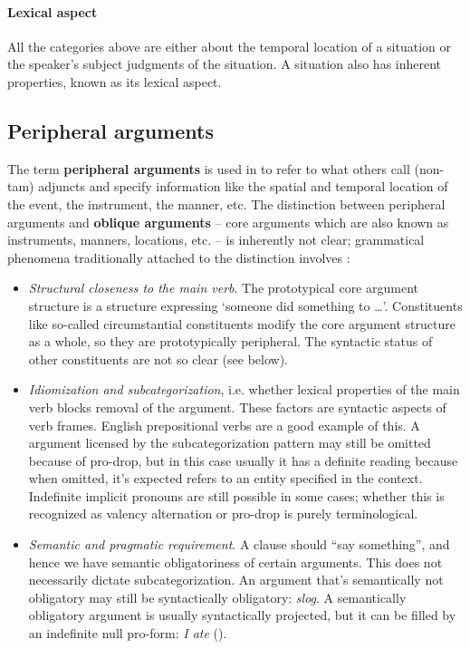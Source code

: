 \documentclass[a4paper, oneside, 12pt]{report}
\newcommand*{\concept}[1]{\textbf{#1}}
\newcommand{\form}[1]{\emph{#1}}
\newcommand{\translate}[1]{`#1'}
\begin{document}
\paragraph*{Lexical aspect}
All the categories above are either about the temporal location of a situation
or the speaker's subject judgments of the situation.
A situation also has inherent properties,
known as its lexical aspect.

\subsection{Peripheral arguments}\label{sec:grammatical.clause.peripheral}

The term \concept{peripheral arguments} is used in \citet{dixon2009basic1}
to refer to what others call (non-\ac{tam}) adjuncts
and specify information like the spatial and temporal location of the event,
the instrument, the manner, etc.
The distinction between peripheral arguments and
\concept{oblique arguments} -- core arguments which are also known as instruments, manners, locations, etc. --
is inherently not clear;
grammatical phenomena traditionally attached to the distinction involves 
\citep{mcinnerney2022argument}:
\begin{itemize}
    \item \emph{Structural closeness to the main verb}.
    The prototypical core argument structure is a structure expressing 
    \translate{someone did something to \dots}.
    Constituents like so-called circumstantial constituents modify the core argument structure as a whole,
    so they are prototypically peripheral. 
    The syntactic status of other constituents are not so clear (see below).

    \item \emph{Idiomization and subcategorization},
    i.e. whether lexical properties of the main verb blocks removal of the argument.
    These factors are syntactic aspects of verb frames.
    English prepositional verbs are a good example of this.
    A argument licensed by the subcategorization pattern may still be omitted
    because of pro-drop,
    but in this case usually it has a definite reading
    because when omitted, it's expected refers to an entity specified in the context.
    Indefinite implicit pronouns are still possible in some cases;
    whether this is recognized as valency alternation or pro-drop
    is purely terminological.

    \item \emph{Semantic and pragmatic requirement}.
    A clause should ``say something'', and hence we have semantic obligatoriness of certain arguments.
    This does not necessarily dictate subcategorization.
    An argument that's semantically not obligatory may still be syntactically obligatory: \form{slog}.
    A semantically obligatory argument is usually syntactically projected,
    but it can be filled by an indefinite null pro-form:
    \form{I ate} ().
\end{itemize}
\end{document}
